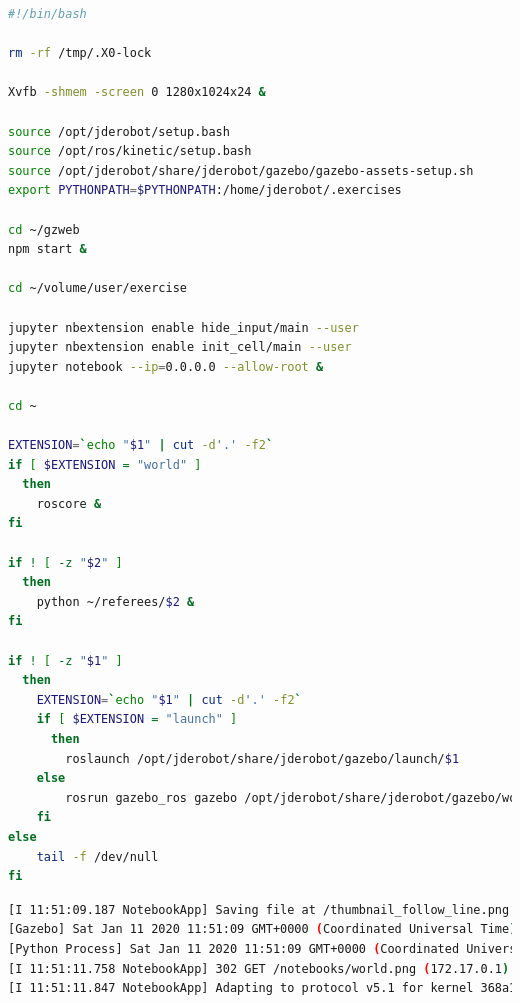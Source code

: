 \begin{lstlisting}[language=bash, caption=Código de Inicio del Secuenciador]
#!/bin/bash

rm -rf /tmp/.X0-lock

Xvfb -shmem -screen 0 1280x1024x24 &

source /opt/jderobot/setup.bash
source /opt/ros/kinetic/setup.bash
source /opt/jderobot/share/jderobot/gazebo/gazebo-assets-setup.sh
export PYTHONPATH=$PYTHONPATH:/home/jderobot/.exercises

cd ~/gzweb
npm start &

cd ~/volume/user/exercise

jupyter nbextension enable hide_input/main --user
jupyter nbextension enable init_cell/main --user
jupyter notebook --ip=0.0.0.0 --allow-root &

cd ~

EXTENSION=`echo "$1" | cut -d'.' -f2`
if [ $EXTENSION = "world" ]
  then
    roscore &
fi

if ! [ -z "$2" ]
  then
    python ~/referees/$2 &
fi

if ! [ -z "$1" ]
  then
    EXTENSION=`echo "$1" | cut -d'.' -f2`
    if [ $EXTENSION = "launch" ]
      then
        roslaunch /opt/jderobot/share/jderobot/gazebo/launch/$1
    else
        rosrun gazebo_ros gazebo /opt/jderobot/share/jderobot/gazebo/worlds/$1
    fi
else
    tail -f /dev/null
fi
\end{lstlisting}
\begin{lstlisting}[language=bash, caption=Reenvío de Mensajes]
[I 11:51:09.187 NotebookApp] Saving file at /thumbnail_follow_line.png
[Gazebo] Sat Jan 11 2020 11:51:09 GMT+0000 (Coordinated Universal Time) Received Message: {"op":"advertise","id":"advertise:~/heartbeat:14","type":"heartbeat","topic":"~/heartbeat"} from http://127.0.0.1:8080 ::ffff:172.17.0.1
[Python Process] Sat Jan 11 2020 11:51:09 GMT+0000 (Coordinated Universal Time) Received Message: {"op":"publish","id":"publish:~/heartbeat:15","topic":"~/heartbeat","msg":{"alive":1}} from http://127.0.0.1:8080 ::ffff:172.17.0.1
[I 11:51:11.758 NotebookApp] 302 GET /notebooks/world.png (172.17.0.1) 0.95ms
[I 11:51:11.847 NotebookApp] Adapting to protocol v5.1 for kernel 368a1e46-acc2-4976-acf3-25528ae77d77
\end{lstlisting}

